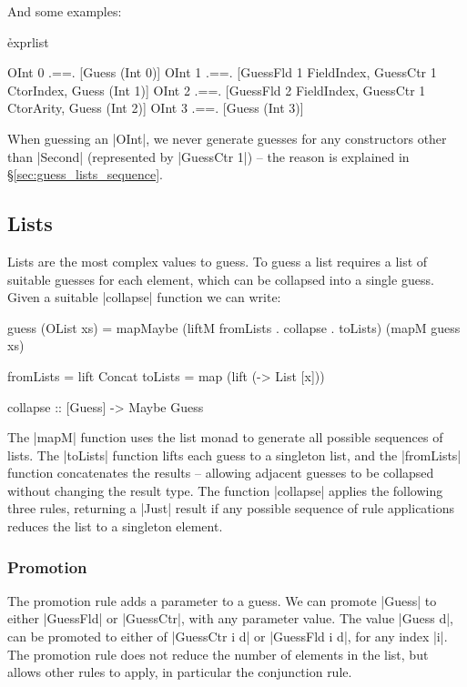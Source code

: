 \documentclass{llncs}
\begin{document}
\noindent And some examples:

\h{exprlist}\begin{code}
OInt 0  .==.  [Guess (Int 0)]
OInt 1  .==.  [GuessFld 1 FieldIndex, GuessCtr 1 CtorIndex, Guess (Int 1)]
OInt 2  .==.  [GuessFld 2 FieldIndex, GuessCtr 1 CtorArity, Guess (Int 2)]
OInt 3  .==.  [Guess (Int 3)]
\end{code}

When guessing an |OInt|, we never generate guesses for any constructors other than |Second| (represented by |GuessCtr 1|) -- the reason is explained in \S\ref{sec:guess_lists_sequence}.

\subsection{Lists}
\label{sec:guess_lists}

Lists are the most complex values to guess. To guess a list requires a list of suitable guesses for each element, which can be collapsed into a single guess. Given a suitable |collapse| function we can write:

\begin{code}
guess (OList xs) =
    mapMaybe (liftM fromLists . collapse . toLists) (mapM guess xs)

fromLists  = lift Concat
toLists    = map (lift (\x -> List [x]))

collapse :: [Guess] -> Maybe Guess
\end{code}

The |mapM| function uses the list monad to generate all possible sequences of lists. The |toLists| function lifts each guess to a singleton list, and the |fromLists| function concatenates the results -- allowing adjacent guesses to be collapsed without changing the result type. The function |collapse| applies the following three rules, returning a |Just| result if any possible sequence of rule applications reduces the list to a singleton element.

\subsubsection{Promotion}

The promotion rule adds a parameter to a guess. We can promote |Guess| to either |GuessFld| or |GuessCtr|, with any parameter value. The value |Guess d|, can be promoted to either of |GuessCtr i d| or |GuessFld i d|, for any index |i|. The promotion rule does not reduce the number of elements in the list, but allows other rules to apply, in particular the conjunction rule.
\end{document}
